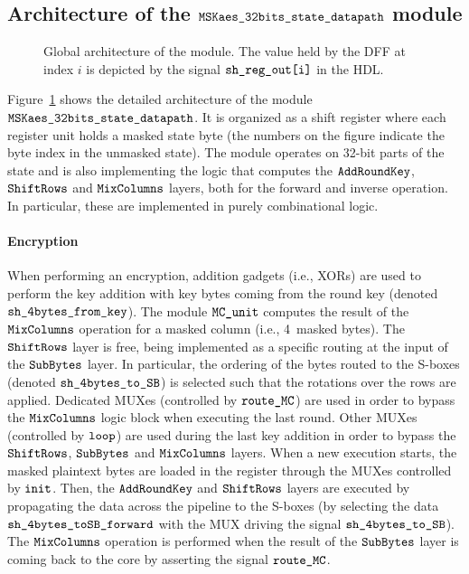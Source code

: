 \documentclass{scrartcl}
\begin{document}
\subsection{Architecture of the $\texttt{MSKaes\_32bits\_state\_datapath}$ module}
\label{sec:architecture}

\begin{figure}
    \centering
    \resizebox{\textwidth}{!}{
        \begin{tikzpicture}
            
        \end{tikzpicture}
    }
    \caption{Global architecture of the \modAESdpState module. The value held by the DFF at index $i$ is depicted by the signal $\texttt{sh\_reg\_out[i]}$ in the HDL.}
    \label{fig:aes_dpState}
\end{figure}

Figure~\ref{fig:aes_dpState} shows the detailed architecture of the
module $\texttt{MSKaes\_32bits\_state\_datapath}$. It is organized as a shift register where each
register unit holds a masked state byte (the numbers on the figure
indicate the byte index in the unmasked state).
The module operates on 32-bit parts of the state and is also implementing the
logic that computes the $\texttt{AddRoundKey}$, $\texttt{ShiftRows}$ and $\texttt{MixColumns}$ layers, both for the forward and inverse operation.
In particular, these are implemented in purely combinational logic.   

\paragraph{Encryption} When performing an encryption, addition gadgets (i.e., XORs) are used to
perform the key addition with key bytes coming from the round key (denoted
$\texttt{sh\_4bytes\_from\_key}$). The module $\texttt{MC\_unit}$ computes the result of the
$\texttt{MixColumns}$ operation for a masked column (i.e., 4~masked bytes). The $\texttt{ShiftRows}$ layer is
free, being implemented as a specific routing at the input of the $\texttt{SubBytes}$ layer.
In particular, the ordering of the bytes routed to the S-boxes (denoted
$\texttt{sh\_4bytes\_to\_SB}$) is selected such that the rotations over the rows are
applied. Dedicated MUXes (controlled by $\texttt{route\_MC}$) are used in
order to bypass the $\texttt{MixColumns}$ logic block when executing the last round.  Other
MUXes (controlled by $\texttt{loop}$) are used during the last key
addition in order to bypass the $\texttt{ShiftRows}$, $\texttt{SubBytes}$ and $\texttt{MixColumns}$ layers.  When a new
execution starts, the masked plaintext bytes are loaded in the register through
the MUXes controlled by $\texttt{init}$.  Then, the $\texttt{AddRoundKey}$ and $\texttt{ShiftRows}$
layers are executed by propagating the data across the pipeline to the S-boxes
(by selecting the data $\texttt{sh\_4bytes\_toSB\_forward}$ with the MUX driving the signal
$\texttt{sh\_4bytes\_to\_SB}$).  The $\texttt{MixColumns}$ operation is performed when the result of the
$\texttt{SubBytes}$ layer is coming back to the core by asserting the signal
$\texttt{route\_MC}$. 
\end{document}
